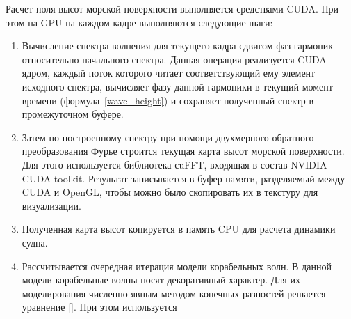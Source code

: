 Расчет поля высот морской поверхности выполняется средствами CUDA. При этом на GPU на каждом кадре выполняются следующие шаги:

\begin{enumerate}
\item Вычисление спектра волнения для текущего кадра сдвигом фаз гармоник относительно начального спектра. Данная операция реализуется CUDA-ядром, каждый поток которого читает соответствующий ему элемент исходного спектра, вычисляет фазу данной гармоники в текущий момент времени (формула~\ref{wave_height}) и сохраняет полученный спектр в промежуточном буфере.

\item Затем по построенному спектру при помощи двухмерного обратного преобразования Фурье строится текущая карта высот морской поверхности. Для этого используется библиотека сuFFT, входящая в состав NVIDIA CUDA toolkit. Результат записывается в буфер памяти, разделяемый между CUDA и OpenGL, чтобы можно было скопировать их в текстуру для визуализации.

\item Полученная карта высот копируется в память CPU для расчета динамики судна.

\item Рассчитывается очередная итерация модели корабельных волн. В данной модели корабельные волны носят декоративный характер. Для их моделирования численно явным методом конечных разностей решается уравнение []. При этом используется 

\end{enumerate}




